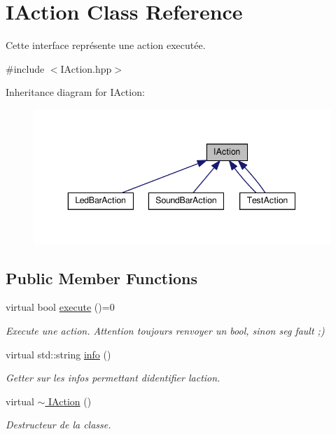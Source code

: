 \hypertarget{classIAction}{}\section{I\+Action Class Reference}
\label{classIAction}


Cette interface représente une action executée.  




{\ttfamily \#include $<$I\+Action.\+hpp$>$}



Inheritance diagram for I\+Action\+:
\nopagebreak
\begin{figure}[H]
\begin{center}
\leavevmode
\includegraphics[width=343pt]{classIAction__inherit__graph}
\end{center}
\end{figure}
\subsection*{Public Member Functions}
\begin{DoxyCompactItemize}
\item 
virtual bool \hyperlink{classIAction_a8fabb15178fbba329f1458326c1d7c94}{execute} ()=0
\begin{DoxyCompactList}\small\item\em Execute une action. Attention toujours renvoyer un bool, sinon seg fault ;) \end{DoxyCompactList}\item 
\mbox{\label{classIAction_a974d617d71344d64d2af7739a9e88d30}} 
virtual std\+::string \hyperlink{classIAction_a974d617d71344d64d2af7739a9e88d30}{info} ()
\begin{DoxyCompactList}\small\item\em Getter sur les infos permettant d\textquotesingle{}identifier l\textquotesingle{}action. \end{DoxyCompactList}\item 
\mbox{\label{classIAction_a4f8166b70afaa7a4c6093fc1975804c6}} 
virtual \hyperlink{classIAction_a4f8166b70afaa7a4c6093fc1975804c6}{$\sim$ I\+Action} ()
\begin{DoxyCompactList}\small\item\em Destructeur de la classe. \end{DoxyCompactList}\end{DoxyCompactItemize}

